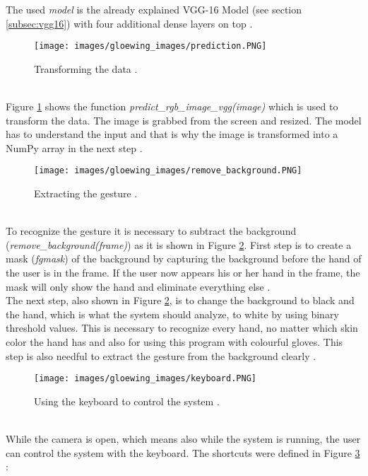 The used \textit{model} is the already explained VGG-16 Model (see section \ref{subsec:vgg16}) with four additional dense layers on top \cite{Brenner2018}.
\begin{figure}
\sidecaption
\texttt{[image: images/gloewing\_images/prediction.PNG]}
\caption{Transforming the data \cite{Brenner2018}.}
\label{fig:predict}
\end{figure}\\
Figure \ref{fig:predict} shows the function \textit{predict\_rgb\_image\_vgg(image)} which is used to transform the data. The image is grabbed from the screen and resized. The model has to understand the input and that is why the image is transformed into a NumPy array in the next step \cite{Brenner2018}.\\
\begin{figure}
\sidecaption
\texttt{[image: images/gloewing\_images/remove\_background.PNG]}
\caption{Extracting the gesture \cite{Brenner2018}.}
\label{fig:remove_background}
\end{figure}\\
To recognize the gesture it is necessary to subtract the background\\ (\textit{remove\_background(frame)}) as it is shown in Figure \ref{fig:remove_background}. First step is to create a mask (\textit{fgmask}) of the background by capturing the background before the hand of the user is in the frame. If the user now appears his or her hand in the frame, the mask will only show the hand and eliminate everything else \cite{Brenner2018}.\\
The next step, also shown in Figure \ref{fig:remove_background}, is to change the background to black and the hand, which is what the system should analyze, to white by using binary threshold values. This is necessary to recognize every hand, no matter which skin color the hand has and also for using this program with colourful gloves. This step is also needful to extract the gesture from the background clearly \cite{Brenner2018}. 
\begin{figure}
\sidecaption
\texttt{[image: images/gloewing\_images/keyboard.PNG]}
\caption{Using the keyboard to control the system \cite{Brenner2018}.}
\label{fig:keyboard}
\end{figure}\\
While the camera is open, which means also while the system is running, the user can control the system with the keyboard. The shortcuts were defined in Figure \ref{fig:keyboard} \cite{Brenner2018}:
